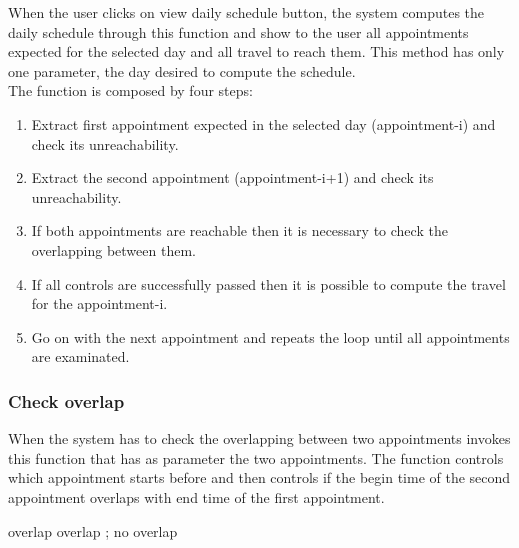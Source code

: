 When the user clicks on view daily schedule button, the system computes the daily schedule through this function and show to the user all appointments expected for the selected day and all travel to reach them.
This method has only one parameter, the day desired to compute the schedule.\\
The function is composed by four steps:
\begin{enumerate}
	\item Extract first appointment expected in the selected day (appointment-i) and check its unreachability.
	\item Extract the second appointment (appointment-i+1) and check its unreachability.
	\item If both appointments are reachable then it is necessary to check the overlapping between them.
	\item If all controls are successfully passed then it is possible to compute the travel for the appointment-i.
	\item Go on with the next appointment and repeats the loop until all appointments are examinated.
\end{enumerate}

\begin{algorithmic}
		
				\State {}
			\EndIf
		\EndFor
		
			\State {}
			\State {}
		\EndIf
	\EndFunction
\end{algorithmic}

\subsubsection{Check overlap}

When the system has to check the overlapping between two appointments invokes this function that has as parameter the two appointments.
The function controls which appointment starts before and then controls if the begin time of the second appointment overlaps with end time of the first appointment.

\begin{algorithmic}
	
			\State \Return overlap
			\State \Return overlap
		\EndIf;
		\State \Return no overlap
	\EndFunction
\end{algorithmic}

